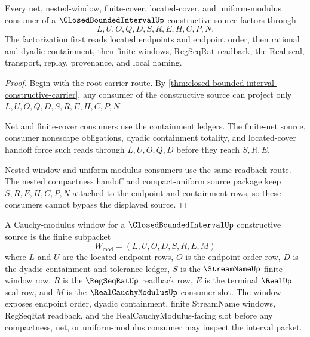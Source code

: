 \begin{theorem}
\label{thm:closed-bounded-interval-constructive-handoff}
Every net, nested-window, finite-cover, located-cover, and uniform-modulus consumer of a $\ClosedBoundedIntervalUp$ constructive source factors through
$$
L,U,O,Q,D,S,R,E,H,C,P,N.
$$
The factorization first reads located endpoints and endpoint order, then rational and dyadic containment, then finite windows, RegSeqRat readback, the Real seal, transport, replay, provenance, and local naming.
\end{theorem}
\begin{proof}
Begin with the root carrier route. By \autoref{thm:closed-bounded-interval-constructive-carrier}, any consumer of the constructive source can project only $L,U,O,Q,D,S,R,E,H,C,P,N$.

Net and finite-cover consumers use the containment ledgers. The finite-net source, consumer nonescape obligations, dyadic containment totality, and located-cover handoff force such reads through $L,U,O,Q,D$ before they reach $S,R,E$.

Nested-window and uniform-modulus consumers use the same readback route. The nested compactness handoff and compact-uniform source package keep $S,R,E,H,C,P,N$ attached to the endpoint and containment rows, so these consumers cannot bypass the displayed source.
\end{proof}

\begin{definition}
\label{def:closed-bounded-interval-cauchy-modulus-window}
A Cauchy-modulus window for a $\ClosedBoundedIntervalUp$ constructive source is the finite subpacket
$$
W_{\mathsf{mod}}=(L,U,O,D,S,R,E,M)
$$
where $L$ and $U$ are the located endpoint rows, $O$ is the endpoint-order row, $D$ is the dyadic containment and tolerance ledger, $S$ is the $\StreamNameUp$ finite-window row, $R$ is the $\RegSeqRatUp$ readback row, $E$ is the terminal $\RealUp$ seal row, and $M$ is the $\RealCauchyModulusUp$ consumer slot. The window exposes endpoint order, dyadic containment, finite StreamName windows, RegSeqRat readback, and the RealCauchyModulus-facing slot before any compactness, net, or uniform-modulus consumer may inspect the interval packet.
\end{definition}

